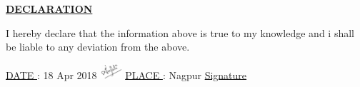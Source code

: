 \documentclass[10pt]{article}
\begin{document}

\begin{center}
	\vspace{10mm}
	\underline{	\textbf{DECLARATION}}
\end{center} 
	I hereby declare that the information above is true to my knowledge and i shall be liable to any deviation from the above.
\begin{flushleft}
	\underline{DATE } \hspace{2mm} : 18 Apr 2018  
	\hspace{10cm} \includegraphics[width=0.06\textwidth]{asign.jpg}
    \hspace{12mm}	\underline{PLACE } \hspace{1mm}:  Nagpur \hspace{10.5cm} \underline{Signature}\\
\end{flushleft}
\end{document}
